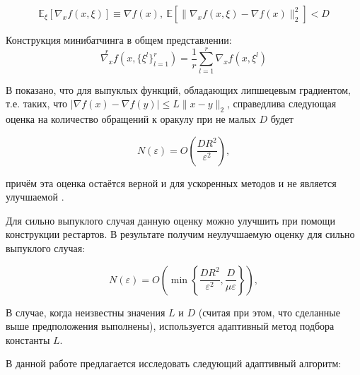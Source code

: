 \documentclass[]{scrartcl}
\begin{document}
\begin{equation}
\mathbb{E}_{\xi}[\nabla_xf(x, \xi)] \equiv \nabla f(x),~\mathbb{E}[\|\nabla_x f(x,\xi)-\nabla f(x)\|_2^2] < D
\end{equation}

Конструкция минибатчинга в общем представлении:
\begin{equation}
\overset{r}{\nabla_x}f(x, \{\xi^l\}_{l=1}^r) = \frac{1}{r}\sum\limits_{l=1}^r \nabla_x f(x, \xi^l)
\end{equation}

В \cite{gas} показано, что для выпуклых функций, обладающих липшецевым градиентом, т.е. таких, что $|\nabla f(x) - \nabla f(y)| \le L\|x-y\|_2$, справедлива следующая оценка на количество обращений к оракулу при не малых $D$ будет 

\begin{equation}
N(\varepsilon) = O\left(\frac{DR^2}{\varepsilon^2}\right),
\end{equation}

причём эта оценка остаётся верной и для ускоренных методов и не является улучшаемой \cite{agarwal2009information}. 

Для сильно выпуклого случая данную оценку можно улучшить при помощи конструкции рестартов. В результате получим неулучшаемую оценку для сильно выпуклого случая:

\begin{equation}
N(\varepsilon) = O\left(\min\left\{\frac{DR^2}{\varepsilon^2}, \frac{D}{\mu \varepsilon}\right\}\right),
\end{equation}

В случае, когда неизвестны значения $L$ и $D$ (считая при этом, что сделанные выше предположения выполнены), используется адаптивный метод подбора константы $L$. 

В данной работе предлагается исследовать следующий адаптивный алгоритм:
\end{document}
